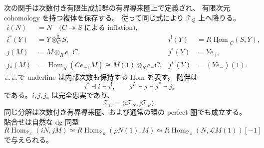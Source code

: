\begin{proposition}
\label{cmo:prop:graded-root-order}
次の関手は次数付き有限生成加群の有界導来圏上で定義され、
有限次元 cohomology を持つ複体を保存する。
従って同じ式により $\mathcal T_Q$ 上へ降りる。
\[
 \begin{aligned}
 i(N)&=N \quad\text{($C\twoheadrightarrow S$ による inflation)},\\
 i^*(Y)&=Y\otimes_C^{\mathbf L}S,
 &i^!(Y)&=\underline{R\operatorname{Hom}}_C(S,Y),\\
 j(M)&=M\otimes_R e_+C,
 &j^*(Y)&=Ye_+,\\
 j_*(M)&=\underline{\operatorname{Hom}}_R(Ce_+,M)
       \cong M(1)\otimes_R e_-C,
 &j^L(Y)&=(Ye_-)(1).
 \end{aligned}
\]
ここで underline は内部次数も保持する Hom を表す。
随伴は
\[
 i^*\dashv i\dashv i^!,\qquad
 j^L\dashv j\dashv j^*\dashv j_*
\]
である。$i,j,j_*$ は完全忠実であり、
\begin{equation}
\label{cmo:eq:root-order-coherent-sod}
 \mathcal T_C=\langle i\mathcal T_S,j\mathcal T_R\rangle.
\end{equation}
同じ分解は次数付き有界導来圏、および通常の環の perfect 圏でも成立する。
貼合せは自然な dg 同型
\begin{equation}
\label{cmo:eq:root-order-gluing}
 R\operatorname{Hom}_{\mathcal T_C}(iN,jM)
 \simeq R\operatorname{Hom}_{\mathcal T_R}(\rho N(1),M)
 \simeq R\operatorname{Hom}_{\mathcal T_S}
             (N,\mathcal L M(1))[-1]
\end{equation}
で与えられる。
\end{proposition}

